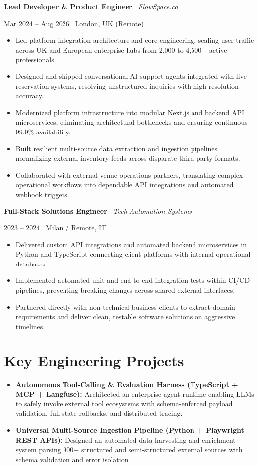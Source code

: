 \documentclass[a4paper,10pt]{article}
\newcommand{\role}[4]{%
  \vspace{2pt}\noindent
  \begin{minipage}[t]{0.70\textwidth}\raggedright\textbf{#1} \textbullet\ \textit{#3}\end{minipage}%
  \hfill
  \begin{minipage}[t]{0.28\textwidth}\raggedleft\footnotesize\color{gray}#2 \textbullet\ #4\end{minipage}%
  \vspace{1pt}%
}
\begin{document}
\vspace{3pt}
\role{Lead Developer \& Product Engineer}{Mar 2024 -- Aug 2026}{FlowSpace.co}{London, UK (Remote)}
\begin{itemize}
  \item Led platform integration architecture and core engineering, scaling user traffic across UK and European enterprise hubs from 2,000 to 4,500+ active professionals.
  \item Designed and shipped conversational AI support agents integrated with live reservation systems, resolving unstructured inquiries with high resolution accuracy.
  \item Modernized platform infrastructure into modular Next.js and backend API microservices, eliminating architectural bottlenecks and ensuring continuous 99.9\% availability.
  \item Built resilient multi-source data extraction and ingestion pipelines normalizing external inventory feeds across disparate third-party formats.
  \item Collaborated with external venue operations partners, translating complex operational workflows into dependable API integrations and automated webhook triggers.
\end{itemize}

\vspace{3pt}
\role{Full-Stack Solutions Engineer}{2023 -- 2024}{Tech Automation Systems}{Milan / Remote, IT}
\begin{itemize}
  \item Delivered custom API integrations and automated backend microservices in Python and TypeScript connecting client platforms with internal operational databases.
  \item Implemented automated unit and end-to-end integration tests within CI/CD pipelines, preventing breaking changes across shared external interfaces.
  \item Partnered directly with non-technical business clients to extract domain requirements and deliver clean, testable software solutions on aggressive timelines.
\end{itemize}

\section{Key Engineering Projects}
\begin{itemize}
  \item \textbf{Autonomous Tool-Calling \& Evaluation Harness (TypeScript + MCP + Langfuse):} Architected an enterprise agent runtime enabling LLMs to safely invoke external tool ecosystems with schema-enforced payload validation, full state rollbacks, and distributed tracing.
  \item \textbf{Universal Multi-Source Ingestion Pipeline (Python + Playwright + REST APIs):} Designed an automated data harvesting and enrichment system parsing 900+ structured and semi-structured external sources with schema validation and error isolation.
\end{itemize}
\end{document}
